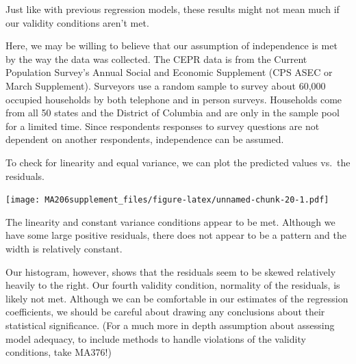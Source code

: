 \documentclass[]{book}
\newenvironment{Shaded}{\begin{snugshade}}{\end{snugshade}}
\newcommand{\DataTypeTok}[1]{\textcolor[rgb]{0.13,0.29,0.53}{#1}}
\newcommand{\DecValTok}[1]{\textcolor[rgb]{0.00,0.00,0.81}{#1}}
\newcommand{\KeywordTok}[1]{\textcolor[rgb]{0.13,0.29,0.53}{\textbf{#1}}}
\newcommand{\NormalTok}[1]{#1}
\newcommand{\OperatorTok}[1]{\textcolor[rgb]{0.81,0.36,0.00}{\textbf{#1}}}
\newcommand{\StringTok}[1]{\textcolor[rgb]{0.31,0.60,0.02}{#1}}
\begin{document}
Just like with previous regression models, these results might not mean much if our validity conditions aren't met.

Here, we may be willing to believe that our assumption of independence is met by the way the data was collected. The CEPR data is from the Current Population Survey's Annual Social and Economic Supplement (CPS ASEC or March Supplement). Surveyors use a random sample to survey about 60,000 occupied households by both telephone and in person surveys. Households come from all 50 states and the District of Columbia and are only in the sample pool for a limited time. Since respondents responses to survey questions are not dependent on another respondents, independence can be assumed.

To check for linearity and equal variance, we can plot the predicted values vs.~the residuals.

\begin{Shaded}
\end{Shaded}

\texttt{[image: MA206supplement\_files/figure-latex/unnamed-chunk-20-1.pdf]}

The linearity and constant variance conditions appear to be met. Although we have some large positive residuals, there does not appear to be a pattern and the width is relatively constant.

Our histogram, however, shows that the residuals seem to be skewed relatively heavily to the right. Our fourth validity condition, normality of the residuals, is likely not met. Although we can be comfortable in our estimates of the regression coefficients, we should be careful about drawing any conclusions about their statistical significance. (For a much more in depth assumption about assessing model adequacy, to include methods to handle violations of the validity conditions, take MA376!)
\end{document}

